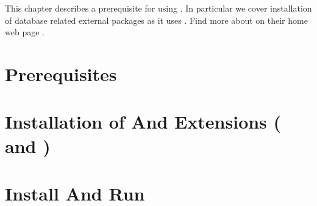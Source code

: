 
This chapter describes a prerequisite for using {\pubs}. In particular we
cover installation of database related external packages as it uses {\psql}.
Find more about {\psql} on their home web page \cite{PSQLHome}.

\section{Prerequisites}


\section{Installation of {\psql} And Extensions ({\psycopg} and {\hstore})}


\section{Install And Run {\pubs}}

